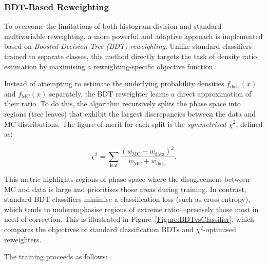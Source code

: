 \subsubsection{BDT-Based Reweighting}
\label{Section:Chapter6_FakeFactors_BDT}

To overcome the limitations of both histogram division and standard multivariable reweighting, a more powerful and adaptive approach is implemented based on \textit{Boosted Decision Tree (BDT) reweighting}. Unlike standard classifiers trained to separate classes, this method directly targets the task of density ratio estimation by maximising a reweighting-specific objective function.

Instead of attempting to estimate the underlying probability densities $f_\text{data}(x)$ and $f_\text{MC}(x)$ separately, the BDT reweighter learns a direct approximation of their ratio. To do this, the algorithm recursively splits the phase space into regions (tree leaves) that exhibit the largest discrepancies between the data and MC distributions. The figure of merit for each split is the \textit{symmetrised $\chi^2$}, defined as:

\begin{equation}
    \chi^2 = \sum_\text{leaf} \frac{(w_\text{MC} - w_\text{data})^2}{w_\text{MC} + w_\text{data}}.
\end{equation}

This metric highlights regions of phase space where the disagreement between MC and data is large and prioritises those areas during training. In contrast, standard BDT classifiers minimise a classification loss (such as cross-entropy), which tends to underemphasise regions of extreme ratio—precisely those most in need of correction. This is illustrated in Figure~\ref{Figure:BDTvsClassifier}, which compares the objectives of standard classification BDTs and $\chi^2$-optimised reweighters.


The training proceeds as follows:

